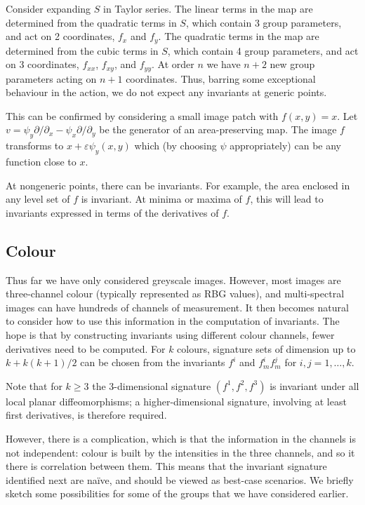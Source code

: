 \documentclass[review,onefignum,onetabnum]{siamonline190516}
\begin{document}
Consider expanding $S$ in Taylor series. The linear terms in the map are determined from the quadratic terms in $S$, which contain 3 group parameters, and act on 2 coordinates, $f_x$ and $f_y$.  The quadratic terms in the map are determined from the cubic terms in $S$, which contain 4 group parameters, and act on 3 coordinates, $f_{xx}$, $f_{xy}$, and $f_{yy}$. At order $n$ we have $n+2$ new group parameters acting on $n+1$ coordinates. Thus, barring some exceptional behaviour in the action, we do not expect any invariants at generic points.

This can be confirmed by considering a small image patch with $f(x,y)=x.$ Let $v=\psi_y\partial/\partial_x - \psi_x\partial/\partial_y$ be the generator of an area-preserving map. The image $f$ transforms to $x + \varepsilon \psi_y(x,y)$ which (by choosing $\psi$ appropriately) can be any function close to $x$.

At nongeneric points, there can be invariants. For example, the area enclosed in any level set of $f$ is invariant. At minima or maxima of $f$, this will lead to invariants expressed in terms of the derivatives of $f$.

\subsection{Colour}

Thus far we have only considered greyscale images. However, most images are three-channel colour (typically represented as RBG values), and multi-spectral images can have hundreds of channels of measurement. It then becomes natural to consider how to use this information in the computation of invariants. The hope is that by constructing invariants using different colour channels, fewer derivatives need to be computed. For $k$ colours, signature sets of dimension up to $k + k(k+1)/2$ can be chosen from the invariants $f^i$ and $f^i_m f^j_m$ for $i,j=1,\dots, k$.

Note that for $k\ge 3$ the 3-dimensional signature $(f^1,f^2,f^3)$ is invariant under all local planar diffeomorphisms; a higher-dimensional signature, involving at least first derivatives, is therefore required.

However, there is a complication, which is that the information in the channels is not independent: colour is built by the intensities in the three channels, and so it there is correlation between them. This means that the invariant signature identified next are na\"ive, and should be viewed as best-case scenarios. We briefly sketch some possibilities for some of the groups that we have considered earlier.
\end{document}

